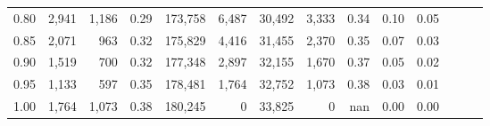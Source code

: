 \begin{tabular}{rrrrrrrrrrrrrr}
0.80 &   2,941 &  1,186 &  0.29 &  173,758 &    6,487 &  30,492 &   3,333 &  0.34 &  0.10 &      0.05 \\
0.85 &   2,071 &    963 &  0.32 &  175,829 &    4,416 &  31,455 &   2,370 &  0.35 &  0.07 &      0.03 \\
0.90 &   1,519 &    700 &  0.32 &  177,348 &    2,897 &  32,155 &   1,670 &  0.37 &  0.05 &      0.02 \\
0.95 &   1,133 &    597 &  0.35 &  178,481 &    1,764 &  32,752 &   1,073 &  0.38 &  0.03 &      0.01 \\
1.00 &   1,764 &  1,073 &  0.38 &  180,245 &        0 &  33,825 &       0 &   nan &  0.00 &      0.00 \\
\bottomrule
\end{tabular}

